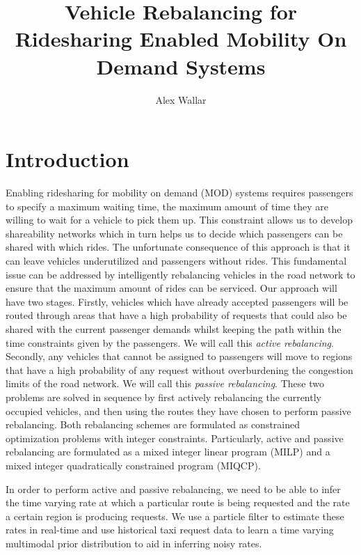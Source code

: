 \documentclass[letterpaper, 10pt, conference]{ieeeconf}
\begin{document}
\title{Vehicle Rebalancing for Ridesharing Enabled Mobility On Demand Systems}

\author{Alex Wallar}

\maketitle

%

\section{Introduction}

Enabling ridesharing for mobility on demand (MOD) systems requires passengers
to specify a maximum waiting time, the maximum amount of time they are willing
to wait for a vehicle to pick them up. This constraint allows us to develop
shareability networks which in turn helps us to decide which passengers can be
shared with which rides. The unfortunate consequence of this approach is that
it can leave vehicles underutilized and passengers without rides. This
fundamental issue can be addressed by intelligently rebalancing vehicles in the
road network to ensure that the maximum amount of rides can be serviced.  Our
approach will have two stages. Firstly, vehicles which have already accepted
passengers will be routed through areas that have a high probability of
requests that could also be shared with the current passenger demands whilst
keeping the path within the time constraints given by the passengers.  We will
call this \emph{active rebalancing}. Secondly, any vehicles that cannot be
assigned to passengers will move to regions that have a high probability of any
request without overburdening the congestion limits of the road network. We
will call this \emph{passive rebalancing}. These two problems are solved in
sequence by first actively rebalancing the currently occupied vehicles, and
then using the routes they have chosen to perform passive rebalancing. Both
rebalancing schemes are formulated as constrained optimization problems with
integer constraints. Particularly, active and passive rebalancing are
formulated as a mixed integer linear program (MILP) and a mixed integer
quadratically constrained program (MIQCP).

In order to perform active and passive rebalancing, we need to be able to infer
the time varying rate at which a particular route is being requested and the
rate a certain region is producing requests. We use a particle filter to
estimate these rates in real-time and use historical taxi request data to learn
a time varying multimodal prior distribution to aid in inferring noisy rates.
\end{document}
